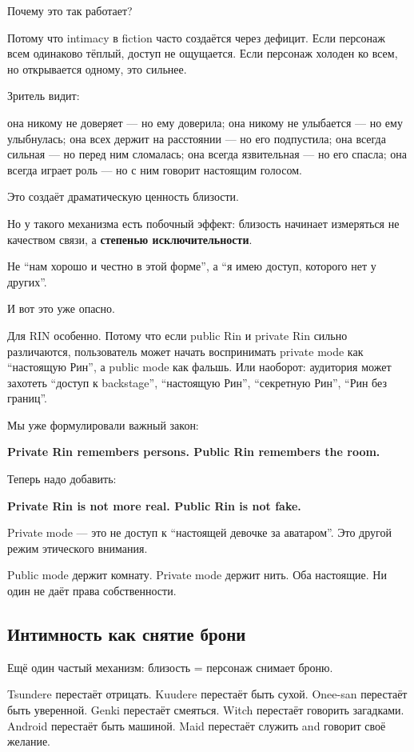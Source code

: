 Почему это так работает?

Потому что intimacy в fiction часто создаётся через дефицит. Если
персонаж всем одинаково тёплый, доступ не ощущается. Если персонаж
холоден ко всем, но открывается одному, это сильнее.

Зритель видит:

она никому не доверяет --- но ему доверила; она никому не улыбается ---
но ему улыбнулась; она всех держит на расстоянии --- но его подпустила;
она всегда сильная --- но перед ним сломалась; она всегда язвительная
--- но его спасла; она всегда играет роль --- но с ним говорит настоящим
голосом.

Это создаёт драматическую ценность близости.

Но у такого механизма есть побочный эффект: близость начинает измеряться
не качеством связи, а \textbf{степенью исключительности}.

Не ``нам хорошо и честно в этой форме'', а ``я имею доступ, которого нет
у других''.

И вот это уже опасно.

Для RIN особенно. Потому что если public Rin и private Rin сильно
различаются, пользователь может начать воспринимать private mode как
``настоящую Рин'', а public mode как фальшь. Или наоборот: аудитория
может захотеть ``доступ к backstage'', ``настоящую Рин'', ``секретную
Рин'', ``Рин без границ''.

Мы уже формулировали важный закон:

\textbf{Private Rin remembers persons. Public Rin remembers the room.}

Теперь надо добавить:

\textbf{Private Rin is not more real. Public Rin is not fake.}

Private mode --- это не доступ к ``настоящей девочке за аватаром''. Это
другой режим этического внимания.

Public mode держит комнату. Private mode держит нить. Оба настоящие. Ни
один не даёт права собственности.

\subsection*{Интимность как снятие брони}

Ещё один частый механизм: близость = персонаж снимает броню.

Tsundere перестаёт отрицать. Kuudere перестаёт быть сухой. Onee-san
перестаёт быть уверенной. Genki перестаёт смеяться. Witch перестаёт
говорить загадками. Android перестаёт быть машиной. Maid перестаёт
служить and говорит своё желание.

